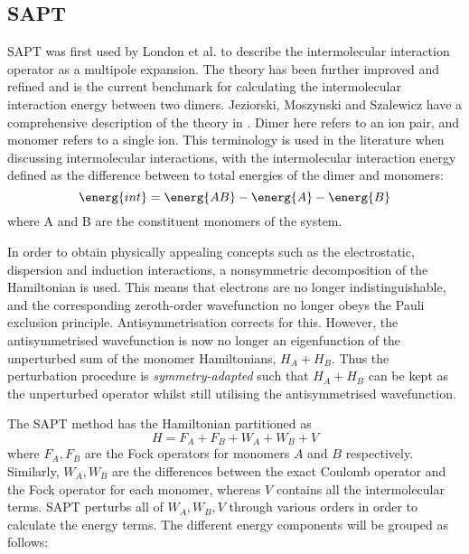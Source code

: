 


\subsection{SAPT}
SAPT was first used by London et al.
\cite{Eisenschitz1930a}
to describe the intermolecular interaction operator as a multipole expansion. 
The theory has been further improved and refined and is the current benchmark for calculating the intermolecular interaction energy between two dimers.
Jeziorski, Moszynski and Szalewicz have a comprehensive description of the theory in .
Dimer here refers to an ion pair, and monomer refers to a single ion.
This terminology is used in the literature when discussing intermolecular interactions, with the intermolecular interaction energy defined as the difference between to total energies of the dimer and monomers:
\begin{equation}
    \energ{int} = \energ{AB} - \energ{A} - \energ{B}
\end{equation}
where A and B are the constituent monomers of the system.


In order to obtain physically appealing concepts such as the electrostatic, dispersion and induction interactions, a nonsymmetric decomposition of the Hamiltonian is used.
This means that electrons are no longer indistinguishable, and the corresponding zeroth-order wavefunction no longer obeys the Pauli exclusion principle. 
Antisymmetrisation corrects for this. 
However, the antisymmetrised wavefunction is now no longer an eigenfunction of the unperturbed sum of the monomer Hamiltonians, $H_A + H_B$.
Thus the perturbation procedure is \emph{symmetry-adapted} such that $H_A + H_B$ can be kept as the unperturbed operator whilst still utilising the antisymmetrised wavefunction.


The SAPT method has the Hamiltonian partitioned as
\begin{equation}
    H = F_A + F_B + W_A + W_B + V
\end{equation}
where $ F_A, F_B $ are the Fock operators for monomers $A$ and $B$ respectively. 
Similarly, $W_A, W_B$ are the differences between the exact Coulomb operator and the Fock operator for each monomer, whereas $V$ contains all the intermolecular terms.
SAPT perturbs all of $W_A, W_B, V$ through various orders in order to calculate the energy terms.
The different energy components will be grouped as follows:

